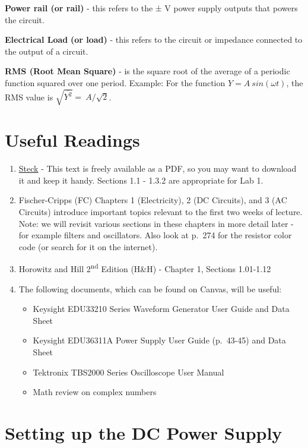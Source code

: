 \documentclass[
]{article}
\begin{document}
\textbf{Power rail (or rail)} - this refers to the ± V power supply
outputs that powers the circuit.

\textbf{Electrical Load} \textbf{(or load)} - this refers to the circuit
or impedance connected to the output of a circuit.

\textbf{RMS (Root Mean Square)} - is the square root of the average of a
periodic function squared over one period. Example: For the function
\(Y = A\ sin(\omega t)\), the RMS value is
\(\sqrt{\overline{Y^{2}}} =\ A/\sqrt{2}\).

\hypertarget{useful-readings}{%
\section{Useful Readings}\label{useful-readings}}

\begin{enumerate}
\def\labelenumi{\arabic{enumi}.}
\item
  \href{https://atomoptics-nas.uoregon.edu/~dsteck/teaching/electronics/electronics-notes.pdf}{Steck}
  - This text is freely available as a PDF, so you may want to download
  it and keep it handy. Sections 1.1 - 1.3.2 are appropriate for Lab 1.
\item
  Fischer-Cripps (FC) Chapters 1 (Electricity), 2 (DC Circuits), and 3
  (AC Circuits) introduce important topics relevant to the first two
  weeks of lecture. Note: we will revisit various sections in these
  chapters in more detail later - for example filters and oscillators.
  Also look at p.~274 for the resistor color code (or search for it on
  the internet).
\item
  Horowitz and Hill 2\textsuperscript{nd} Edition (H\&H) - Chapter 1,
  Sections 1.01-1.12
\item
  The following documents, which can be found on Canvas, will be useful:

  \begin{itemize}
  \item
    Keysight EDU33210 Series Waveform Generator User Guide and Data
    Sheet
  \item
    Keysight EDU36311A Power Supply User Guide (p.~43-45) and Data Sheet
  \item
    Tektronix TBS2000 Series Oscilloscope User Manual
  \item
    Math review on complex numbers
  \end{itemize}
\end{enumerate}

\hypertarget{setting-up-the-dc-power-supply}{%
\section{Setting up the DC Power
Supply}\label{setting-up-the-dc-power-supply}}
\end{document}
